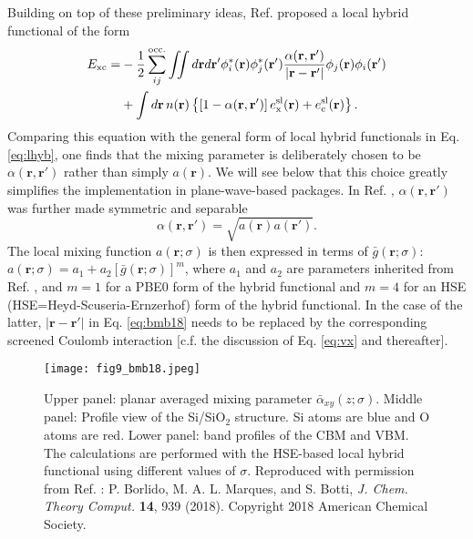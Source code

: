 \documentclass[aip, amsmath, amssymb, reprint, longbibliography]{revtex4-2}
\def\mr{\mathbf{r}}
\begin{document}
Building on top of these preliminary ideas, Ref.  proposed a local hybrid functional of the form
\begin{equation}
\begin{split}
E_{\rm xc} = & -\frac{1}{2}\sum_{ij}^{\rm occ.}\iint d\mr d\mr' \phi_i^*(\mr)\phi_j^*(\mr')\frac{\alpha(\mr,\mr')}{|\mr-\mr'|}\phi_j(\mr)\phi_i(\mr') \\
& + \int d\mr \, n(\mr)\left\{\left[1-\alpha(\mr,\mr')\right]e_{\rm x}^{\rm sl}(\mr)+e_{\rm c}^{\rm sl}(\mr)\right\}.
\end{split}
\label{eq:bmb18}
\end{equation}
Comparing this equation with the general form of local hybrid functionals in Eq. \eqref{eq:lhyb}, one finds that the mixing parameter is deliberately chosen to be $\alpha(\mr,\mr')$ rather than simply $a(\mr)$. We will see below that this choice greatly simplifies the implementation in plane-wave-based packages. In Ref. , $\alpha(\mr,\mr')$ was further made symmetric and separable
\begin{equation}
\alpha(\mr,\mr')=\sqrt{a(\mr)a(\mr')}.
\label{eq:bmb18b}
\end{equation}
The local mixing function $a(\mr;\sigma)$ is then expressed in terms of $\bar{g}(\mr;\sigma)$: $a(\mr;\sigma)=a_1+a_2[\bar{g}(\mr;\sigma)]^m$, where $a_1$ and $a_2$ are parameters inherited from Ref. , and $m=1$ for a PBE0 form of the hybrid functional and $m=4$ for an HSE (HSE=Heyd-Scuseria-Ernzerhof) form of the hybrid functional. In the case of the latter, $|\mr-\mr'|$ in Eq. \eqref{eq:bmb18} needs to be replaced by the corresponding screened Coulomb interaction [c.f. the discussion of Eq. \eqref{eq:vx} and thereafter]. 

\begin{figure}[htp]
\centering
\texttt{[image: fig9\_bmb18.jpeg]}
\caption{Upper panel: planar averaged mixing parameter $\bar{\alpha}_{xy}(z;\sigma)$. Middle panel: Profile view of the Si/SiO$_2$ structure. Si atoms are blue and O atoms are red. Lower panel: band profiles of the CBM and VBM. The calculations are performed with the HSE-based local hybrid functional using different values of $\sigma$. Reproduced with
permission from Ref. : P. Borlido, M. A. L. Marques, and S. Botti, \emph{J. Chem. Theory Comput.} \textbf{14}, 939 (2018). Copyright 2018 American Chemical Society.}
\label{fig:bmb18}
\end{figure}
\end{document}
